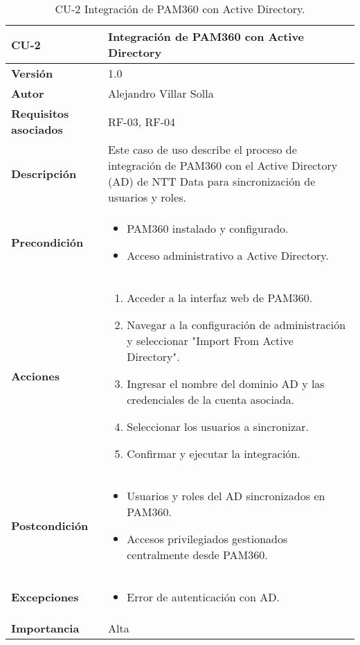 \begin{table}[p]
	\centering
	\begin{tabularx}{\linewidth}{ p{} p{} }
		\toprule
		\textbf{CU-2}    & \textbf{Integración de PAM360 con Active Directory}\\
		\toprule
		\textbf{Versión}              & 1.0    \\
		\textbf{Autor}                & Alejandro Villar Solla \\
		\textbf{Requisitos asociados} & RF-03, RF-04 \\
		\textbf{Descripción}          & Este caso de uso describe el proceso de integración de PAM360 con el Active Directory (AD) de NTT Data para sincronización de usuarios y roles. \\
		\textbf{Precondición}         & 
		\begin{itemize}
			\item PAM360 instalado y configurado.
			\item Acceso administrativo a Active Directory.
		\end{itemize}\\
		\textbf{Acciones}             &
		\begin{enumerate}
			\item Acceder a la interfaz web de PAM360.
			\item Navegar a la configuración de administración y seleccionar "Import From Active Directory".
			\item Ingresar el nombre del dominio AD y las credenciales de la cuenta asociada.
			\item Seleccionar los usuarios a sincronizar.
			\item Confirmar y ejecutar la integración.
		\end{enumerate}\\
		\textbf{Postcondición}        & 
		\begin{itemize}
			\item Usuarios y roles del AD sincronizados en PAM360.
			\item Accesos privilegiados gestionados centralmente desde PAM360.
		\end{itemize}\\
		\textbf{Excepciones}          & 
		\begin{itemize}
			\item Error de autenticación con AD.
		\end{itemize}\\
		\textbf{Importancia}          & Alta \\
		\bottomrule
	\end{tabularx}
	\caption{CU-2 Integración de PAM360 con Active Directory.}
\end{table}

